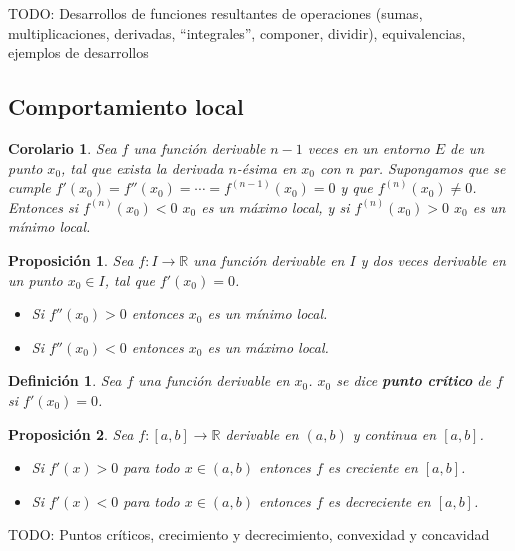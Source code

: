 \documentclass{article}
\newtheorem{prop}{Proposición}
\newtheorem{cor}{Corolario}
\newtheorem{define}{Definición}
\newcommand{\reales}{\mathbb{R}}
\begin{document}
TODO: Desarrollos de funciones resultantes de operaciones (sumas, multiplicaciones, derivadas, ``integrales'', componer, dividir), equivalencias, ejemplos de desarrollos

\subsection{Comportamiento local}

\begin{cor}
	Sea $f$ una función derivable $n-1$ veces en un entorno $E$ de un punto $x_0$, tal que exista la derivada $n$-ésima en $x_0$ con $n$ par. Supongamos que se cumple $f'(x_0) = f''(x_0) = \cdots = f^{(n-1)}(x_0) = 0$ y que $f^{(n)}(x_0) \neq 0$. Entonces si $f^{(n)}(x_0) < 0$ $x_0$ es un máximo local, y si $f^{(n)}(x_0) > 0$ $x_0$ es un mínimo local.
\end{cor}

\begin{prop}
	Sea $f: I \rightarrow \reales$ una función derivable en $I$ y dos veces derivable en un punto $x_0 \in I$, tal que $f'(x_0) = 0$.
	\begin{itemize}
		\item
		Si $f''(x_0) > 0$ entonces $x_0$ es un mínimo local.
	
		\item
		Si $f''(x_0) < 0$ entonces $x_0$ es un máximo local.
	\end{itemize}
\end{prop}

\begin{define}
	Sea $f$ una función derivable en $x_0$. $x_0$ se dice \textbf{punto crítico} de $f$ si $f'(x_0)=0$.
\end{define}

\begin{prop}
	Sea $f: [a, b] \rightarrow \reales$ derivable en $(a, b)$ y continua en $[a, b]$.
	\begin{itemize}
		\item
		Si $f'(x) > 0$ para todo $x \in (a, b)$ entonces $f$ es creciente en $[a, b]$.
		
		\item
		Si $f'(x) < 0$ para todo $x \in (a, b)$ entonces $f$ es decreciente en $[a, b]$.
	\end{itemize}
\end{prop}

TODO: Puntos críticos, crecimiento y decrecimiento, convexidad y concavidad
\end{document}
